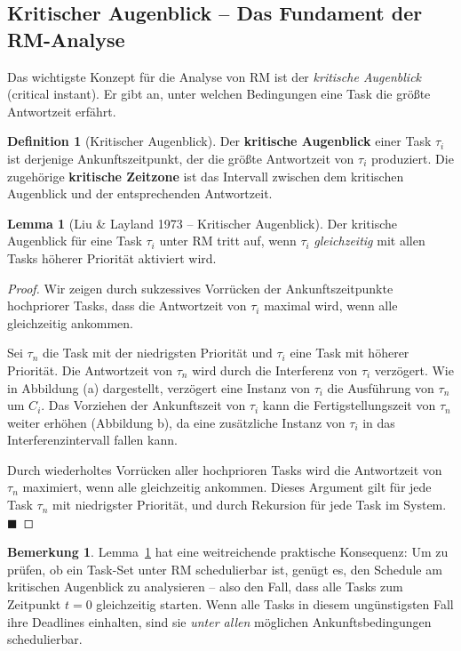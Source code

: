 ﻿\documentclass[a4paper,12pt]{report}
\theoremstyle{definition}
\newtheorem{definition}{Definition}[chapter]
\newtheorem{lemma}{Lemma}[chapter]
\newtheorem{bemerkung}{Bemerkung}[chapter]
\begin{document}
\subsection{Kritischer Augenblick -- Das Fundament der RM-Analyse}

Das wichtigste Konzept für die Analyse von RM ist der \emph{kritische Augenblick}
(critical instant). Er gibt an, unter welchen Bedingungen eine Task die größte
Antwortzeit erfährt.

\begin{definition}[Kritischer Augenblick]
	Der \textbf{kritische Augenblick} einer Task $\tau_i$ ist derjenige
	Ankunftszeitpunkt, der die größte Antwortzeit von $\tau_i$ produziert.
	Die zugehörige \textbf{kritische Zeitzone} ist das Intervall zwischen dem
	kritischen Augenblick und der entsprechenden Antwortzeit.
\end{definition}

\begin{lemma}[Liu \& Layland 1973 -- Kritischer Augenblick]
	\label{lem:critical_instant}
	Der kritische Augenblick für eine Task $\tau_i$ unter RM tritt auf, wenn
	$\tau_i$ \emph{gleichzeitig} mit allen Tasks höherer Priorität aktiviert wird.
\end{lemma}

\begin{proof}
	Wir zeigen durch sukzessives Vorrücken der Ankunftszeitpunkte hochpriorer Tasks,
	dass die Antwortzeit von $\tau_i$ maximal wird, wenn alle gleichzeitig ankommen.

	Sei $\tau_n$ die Task mit der niedrigsten Priorität und $\tau_i$ eine Task mit
	höherer Priorität. Die Antwortzeit von $\tau_n$ wird durch die Interferenz von
	$\tau_i$ verzögert. Wie in Abbildung (a) dargestellt, verzögert eine Instanz von
	$\tau_i$ die Ausführung von $\tau_n$ um $C_i$. Das Vorziehen der Ankunftszeit von
	$\tau_i$ kann die Fertigstellungszeit von $\tau_n$ weiter erhöhen (Abbildung b),
	da eine zusätzliche Instanz von $\tau_i$ in das Interferenzintervall fallen kann.

	Durch wiederholtes Vorrücken aller hochprioren Tasks wird die Antwortzeit von
	$\tau_n$ maximiert, wenn alle gleichzeitig ankommen. Dieses Argument gilt für
	jede Task $\tau_n$ mit niedrigster Priorität, und durch Rekursion für jede
	Task im System. \hfill$\blacksquare$
\end{proof}

\begin{bemerkung}
	Lemma~\ref{lem:critical_instant} hat eine weitreichende praktische Konsequenz:
	Um zu prüfen, ob ein Task-Set unter RM schedulierbar ist, genügt es, den
	Schedule am kritischen Augenblick zu analysieren -- also den Fall, dass alle
	Tasks zum Zeitpunkt $t = 0$ gleichzeitig starten. Wenn alle Tasks in diesem
	ungünstigsten Fall ihre Deadlines einhalten, sind sie \emph{unter allen}
	möglichen Ankunftsbedingungen schedulierbar.
\end{bemerkung}
\end{document}
